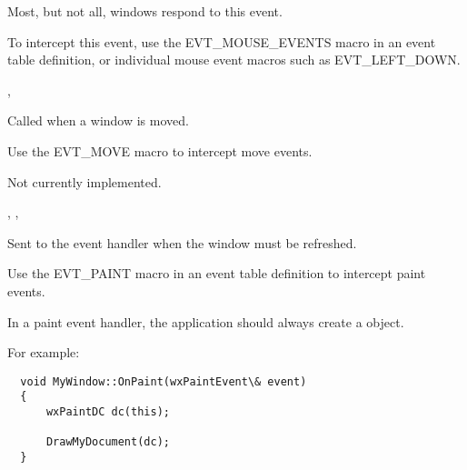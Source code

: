 
Most, but not all, windows respond to this event.

To intercept this event, use the EVT\_MOUSE\_EVENTS macro in an event table definition, or individual
mouse event macros such as EVT\_LEFT\_DOWN.


,\rtfsp
{}

\label{wxwindowonmove}


Called when a window is moved.




Use the EVT\_MOVE macro to intercept move events.


Not currently implemented.


,\rtfsp
{},\rtfsp
{}

\label{wxwindowonpaint}


Sent to the event handler when the window must be refreshed.




Use the EVT\_PAINT macro in an event table definition to intercept paint events.

In a paint event handler, the application should always create a  object.

For example:

\small{%
\begin{verbatim}
  void MyWindow::OnPaint(wxPaintEvent\& event)
  {
      wxPaintDC dc(this);

      DrawMyDocument(dc);
  }
\end{verbatim}
}%

